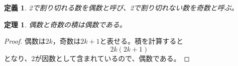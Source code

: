\documentclass{ltjsarticle}
\newtheorem{dfn}{定義} %
\newtheorem{thm}{定理} %
\begin{document}
\begin{dfn}
2で割り切れる数を偶数と呼び、2で割り切れない数を奇数と呼ぶ。
\end{dfn}
\begin{thm}
偶数と奇数の積は偶数である。
\end{thm}
\begin{proof}
偶数は$2k$，奇数は$2k+1$と表せる。積を計算すると
\[ 2k(2k+1) \]
となり、$2$が因数として含まれているので、偶数である。
\end{proof}
\end{document}
